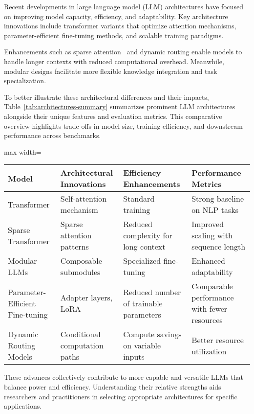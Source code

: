 \documentclass[sigconf]{acmart}
\begin{document}
Recent developments in large language model (LLM) architectures have focused on improving model capacity, efficiency, and adaptability. Key architecture innovations include transformer variants that optimize attention mechanisms, parameter-efficient fine-tuning methods, and scalable training paradigms.

Enhancements such as sparse attention~\cite{} and dynamic routing enable models to handle longer contexts with reduced computational overhead. Meanwhile, modular designs facilitate more flexible knowledge integration and task specialization.

To better illustrate these architectural differences and their impacts, Table~\ref{tab:architectures-summary} summarizes prominent LLM architectures alongside their unique features and evaluation metrics. This comparative overview highlights trade-offs in model size, training efficiency, and downstream performance across benchmarks.

\begin{table*}[htbp]
\centering
\caption{Summary of Key Large Language Model Architectures and Their Evaluation Metrics}
\label{tab:architectures-summary}
\begin{adjustbox}{max width=\textwidth}
\begin{tabular}{@{}llll@{}}
\toprule
Model & Architectural Innovations & Efficiency Enhancements & Performance Metrics \\ \midrule
Transformer & Self-attention mechanism & Standard training & Strong baseline on NLP tasks \\
Sparse Transformer & Sparse attention patterns & Reduced complexity for long context & Improved scaling with sequence length \\
Modular LLMs & Composable submodules & Specialized fine-tuning & Enhanced adaptability \\
Parameter-Efficient Fine-tuning & Adapter layers, LoRA & Reduced number of trainable parameters & Comparable performance with fewer resources \\
Dynamic Routing Models & Conditional computation paths & Compute savings on variable inputs & Better resource utilization \\ \bottomrule
\end{tabular}
\end{adjustbox}
\end{table*}

These advances collectively contribute to more capable and versatile LLMs that balance power and efficiency. Understanding their relative strengths aids researchers and practitioners in selecting appropriate architectures for specific applications.
\end{document}
